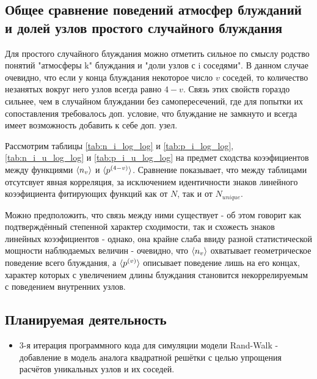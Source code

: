 \newpage

\subsection{Общее сравнение поведений атмосфер блужданий и долей узлов простого случайного блуждания}

Для простого случайного блуждания можно отметить сильное по смыслу родство понятий "атмосферы k" блуждания и "доли узлов с i соседями". 
В данном случае очевидно, что если у конца блуждания некоторое число $v$ соседей, то количество незанятых вокруг него узлов всегда равно $4-v$. 
Связь этих свойств гораздо сильнее, чем в случайном блуждании без самопересечений, где для попытки их сопоставления требовалось доп. условие, что блуждание не замкнуто и всегда имеет возможность добавить к себе доп. узел.

Рассмотрим таблицы \ref{tab:n_i_log_log} и \ref{tab:p_i_log_log}, \ref{tab:n_i_u_log_log} и \ref{tab:p_i_u_log_log} на предмет сходства коээфициентов между функциями $\langle n_v \rangle$ и $\langle p^{(4-v)} \rangle$.
Сравнение показывает, что между таблицами отсутсвует явная корреляция, за исключением идентичности знаков линейного коээфициента фитирующих функций как от $N$, так и от $N_{unique}$. 

Можно предположить, что связь между ними существует - об этом говорит как подтверждённый степенной характер сходимости, так и схожесть знаков линейных коээфициентов - однако, она крайне слаба ввиду разной статистической мощности наблюдаемых величин - очевидно, что $\langle n_v \rangle$ охватывает геометрическое поведение всего блуждания, а $\langle p^{(v)} \rangle$ описывает поведение лишь на его концах, характер которых с увеличением длины блуждания становится некоррелируемым с поведением внутренних узлов.

\newpage

\subsection{Планируемая деятельность}

\begin{itemize}
\item 3-я итерация программного кода для симуляции модели Rand-Walk - добавление в модель аналога квадратной решётки с целью упрощения расчётов уникальных узлов и их соседей.
\end{itemize}
